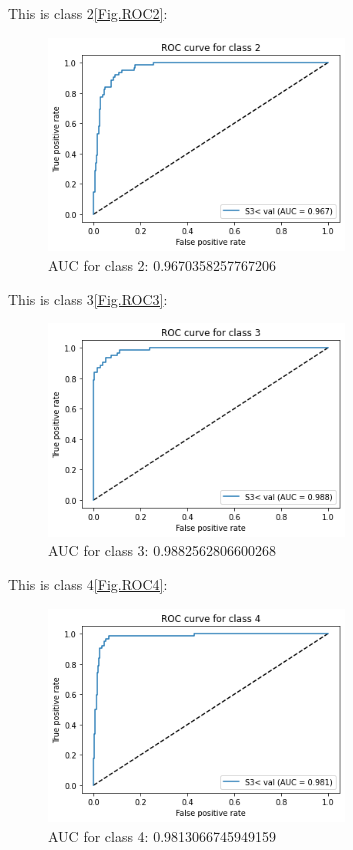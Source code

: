 \documentclass[conference]{IEEEtran}
\begin{document}
This is class 2\ref{Fig.ROC2}:
\begin{figure}[H] 
    \centering %
    \includegraphics[width=0.7\textwidth]{3ROC2.png} %
    \caption{AUC for class 2:  0.9670358257767206} %
    \label{Fig.3ROC2} %
\end{figure}
This is class 3\ref{Fig.ROC3}:
\begin{figure}[H] 
    \centering %
    \includegraphics[width=0.7\textwidth]{3ROC3.png} %
    \caption{AUC for class 3:  0.9882562806600268} %
    \label{Fig.3ROC3} %
\end{figure}
This is class 4\ref{Fig.ROC4}:
\begin{figure}[H] 
    \centering %
    \includegraphics[width=0.7\textwidth]{3ROC4.png} %
    \caption{AUC for class 4:  0.9813066745949159} %
    \label{Fig.3ROC4} %
\end{figure}
\end{document}
